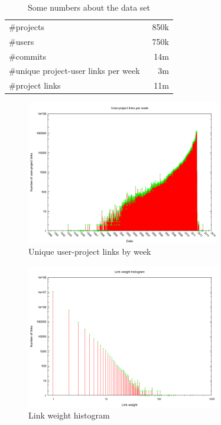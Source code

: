 \documentclass[10pt,a4paper]{article}
\begin{document}
\begin{table}
    \centering
    \begin{tabular}{l r}
        \hline
        \#projects & ~850k \\
        \#users & ~750k \\
        \#commits & ~14m \\
        \#unique project-user links per week & ~3m \\
        \#project links & 11m \\
        \hline
    \end{tabular}
    \caption{Some numbers about the data set}
    \label{tbl:dataset-numbers}
\end{table}

\begin{figure}[htb]
    \centering
    \includegraphics[width=0.75\textwidth]{user-project-links-per-week}
    \caption{Unique user-project links by week}
    \label{fig:user-project-links-per-week}
\end{figure}

\begin{figure}[htb]
    \centering
    \includegraphics[width=0.75\textwidth]{link-weight-histogram}
    \caption{Link weight histogram}
    \label{fig:link-weight-hist}
\end{figure}
\end{document}
